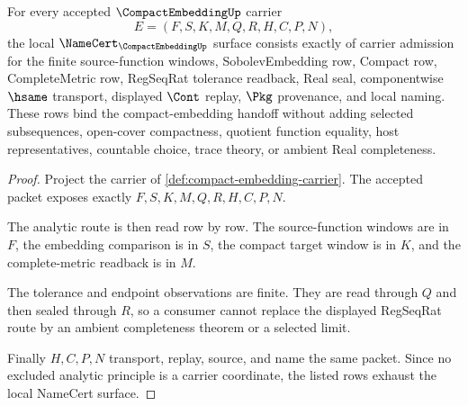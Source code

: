 \begin{theorem}
\label{thm:compact-embedding-namecert-obligations}
For every accepted $\CompactEmbeddingUp$ carrier
$$
E=(F,S,K,M,Q,R,H,C,P,N),
$$
the local $\NameCert_{\CompactEmbeddingUp}$ surface consists exactly of carrier admission for the finite source-function windows, SobolevEmbedding row, Compact row, CompleteMetric row, RegSeqRat tolerance readback, Real seal, componentwise $\hsame$ transport, displayed $\Cont$ replay, $\Pkg$ provenance, and local naming. These rows bind the compact-embedding handoff without adding selected subsequences, open-cover compactness, quotient function equality, host representatives, countable choice, trace theory, or ambient Real completeness.
\end{theorem}
\begin{proof}
Project the carrier of \autoref{def:compact-embedding-carrier}. The accepted packet exposes exactly $F,S,K,M,Q,R,H,C,P,N$.

The analytic route is then read row by row. The source-function windows are in $F$, the embedding comparison is in $S$, the compact target window is in $K$, and the complete-metric readback is in $M$.

The tolerance and endpoint observations are finite. They are read through $Q$ and then sealed through $R$, so a consumer cannot replace the displayed RegSeqRat route by an ambient completeness theorem or a selected limit.

Finally $H,C,P,N$ transport, replay, source, and name the same packet. Since no excluded analytic principle is a carrier coordinate, the listed rows exhaust the local NameCert surface.
\end{proof}

